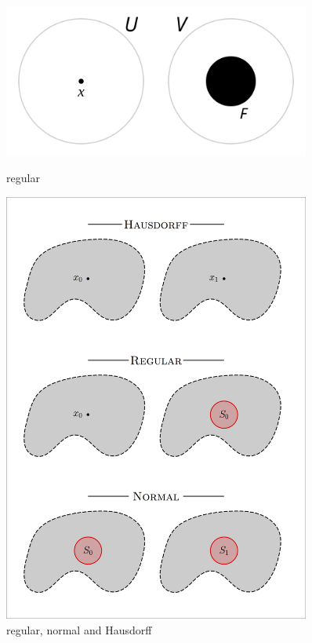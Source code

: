 \documentclass{article}
\begin{document}
\begin{figure}[ht!]
    \centering
    \begin{minipage}{0.45\textwidth}
        \centering
        \includegraphics[width=0.9\textwidth]{images/Regular_space.svg.png} %
        \caption{regular}
        \label{fig:regular}
    \end{minipage}\hfill
    \begin{minipage}{0.45\textwidth}
        \centering
        \includegraphics[width=0.9\textwidth]{images/960px-Hausdorff_regular_normal_space_diagram.png} %
        \caption{regular, normal and Hausdorff}
        \label{fig:normalregHous}
    \end{minipage}
\end{figure}
\end{document}
